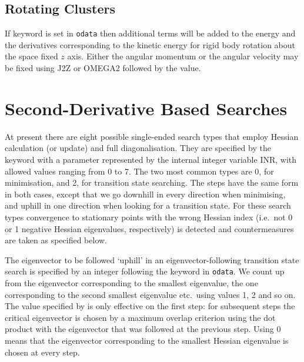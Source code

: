 {{{%

\subsection{Rotating Clusters}If keyword {} is set in 
{\tt odata} then additional terms will be added to the
energy and the derivatives corresponding to the kinetic energy for rigid body rotation
about the space fixed $z$ axis. Either the angular momentum or the angular velocity
may be fixed using { J2Z\/} or { OMEGA2\/} followed by the value.

\section{Second-Derivative Based Searches}
\label{sec:second}
At present there are eight possible single-ended search types 
that employ Hessian calculation (or update) and full diagonalisation. They are specified by
the  keyword with a parameter 
represented by the internal integer variable INR, with allowed values ranging from 0 to 7. 
The two most common
types are 0, for minimisation, and 2, for transition state searching. The steps have
the same form in both cases,\cite{wales94a} except that we go downhill in every direction when
minimising, and uphill in one direction when looking for a transition state. For these
search types convergence to stationary points with the wrong Hessian index (i.e.~not
0 or 1 negative Hessian eigenvalues, respectively) is detected and countermeasures are
taken as specified below. 

The eigenvector to be followed `uphill'
in an eigenvector-following transition state search is specified by an integer following the keyword 
{} in {\tt odata}.  We count up from the eigenvector corresponding to 
the smallest eigenvalue, the one corresponding to the second smallest eigenvalue 
etc.~using values 1, 2 and so on. The value specified by {} is only
effective on the first step: for subsequent steps the critical eigenvector is 
chosen by a maximum overlap criterion using the dot product with the eigenvector 
that was followed at the previous step.  Using {} 0 means that the 
eigenvector corresponding to the smallest Hessian eigenvalue is chosen at every step. 

}}}
